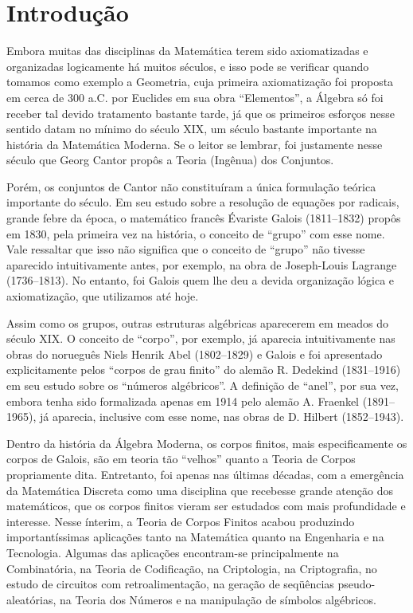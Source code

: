 
\chapter{Introdução}

Embora muitas das disciplinas da Matemática terem sido axiomatizadas e
organizadas logicamente há muitos séculos, e isso pode se verificar
quando tomamos como exemplo a Geometria, cuja primeira
a\-xi\-o\-ma\-ti\-za\-ção foi proposta em cerca de 300 a.C.
por Euclides em sua obra ``Elementos'', a
Álgebra só foi receber tal devido tratamento bastante tarde,
já que os
primeiros esforços nesse sentido datam no mínimo do século XIX, um
século bastante importante na história da Matemática Moderna. Se o
leitor se lembrar, foi justamente nesse século que Georg Cantor propôs
a Teoria (Ingênua) dos Conjuntos.

Porém, os conjuntos de Cantor não constituíram a única formulação
teórica importante do século. Em seu estudo sobre a resolução de
equações por radicais, grande febre da época,
o matemático francês Évariste Galois (1811--1832) propôs em 1830, pela
primeira
vez na história, o conceito de ``grupo'' com esse
nome. Vale ressaltar que isso não significa que o conceito de ``grupo''
não tivesse aparecido intuitivamente
antes, por exemplo, na obra de Joseph-Louis
Lagrange (1736--1813). No entanto, foi Galois quem lhe deu a devida
organização lógica e a\-xi\-o\-ma\-ti\-za\-ção, que utilizamos até hoje.

Assim como os grupos, outras estruturas algébricas aparecerem em meados
do século XIX. O conceito de ``corpo'', por exemplo, já aparecia
intuitivamente nas obras do norueguês Niels Henrik Abel (1802--1829) e
Galois
e
foi apresentado explicitamente pelos ``corpos de grau finito'' do alemão
R. Dedekind (1831--1916) em seu estudo sobre os ``números
algébricos''. A definição de ``anel'', por sua vez, embora tenha sido
formalizada apenas em 1914 pelo alemão A. Fraenkel (1891--1965), já
aparecia, inclusive com esse nome, nas obras de D. Hilbert
(1852--1943).

Dentro da história da Álgebra Moderna,
os corpos finitos, mais especificamente os corpos de Galois, são em
teoria tão ``velhos'' quanto a Teoria de Corpos propriamente
dita. Entretanto, foi apenas nas últimas décadas, com a emergência da
Matemática Discreta como uma disciplina que recebesse grande atenção dos
matemáticos, que os corpos finitos vieram ser estudados com mais
profundidade e interesse. Nesse ínterim, a Teoria de Corpos Finitos
acabou produzindo importantíssimas aplicações tanto na Matemática quanto
na Engenharia e na Tecnologia. Algumas das aplicações encontram-se
principalmente na Combinatória, na Teoria de Codificação, na
Criptologia, na Criptografia, no estudo de circuitos com
retroalimentação, na geração de seqüências pseudo-aleatórias, na Teoria
dos Números e na manipulação de símbolos algébricos.

